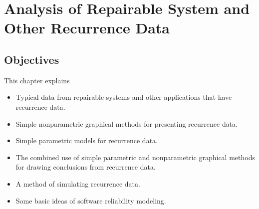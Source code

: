 
\setcounter{chapter}{15}

\chapter{Analysis of Repairable System and Other Recurrence Data}
\label{chapter:repairable.system}




\section*{Objectives}
This chapter explains
\begin{itemize} 
\item
Typical data from repairable systems and other applications
that have recurrence data.
\item
Simple nonparametric graphical methods for
presenting recurrence data.
\item
Simple parametric models for recurrence data.
\item
The combined use of simple parametric and nonparametric
graphical methods for drawing conclusions from recurrence data.
\item
A method of simulating recurrence data.
\item
Some basic ideas of software reliability modeling.
\end{itemize}

